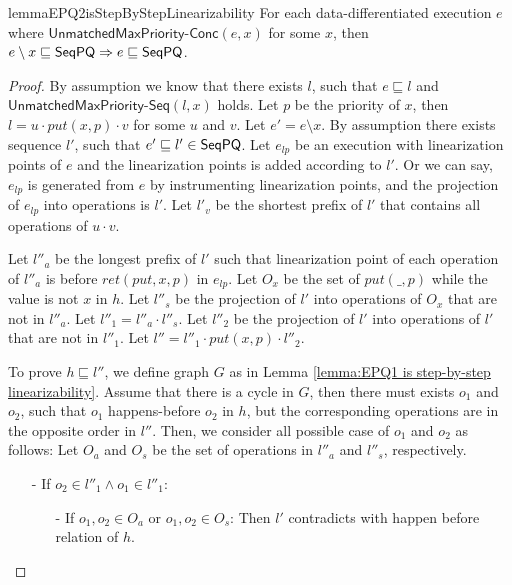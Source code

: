 \begin{restatable}{lemma}{EPQ2isStepByStepLinearizability}
\label{lemma:EPQ2 is step-by-step linearizability}
For each data-differentiated execution $e$ where $\mathsf{UnmatchedMaxPriority}\mathsf{\text{-}Conc}(e,x)$ for some $x$, then $e \setminus x \sqsubseteq \mathsf{SeqPQ} \Rightarrow e \sqsubseteq \mathsf{SeqPQ}$.
\end{restatable}

\begin {proof}

By assumption we know that there exists $l$, such that $e \sqsubseteq l$ and $\mathsf{UnmatchedMaxPriority\text{-}Seq}(l,x)$ holds. Let $p$ be the priority of $x$, then $l=u \cdot \textit{put}(x,p) \cdot v$ for some $u$ and $v$. Let $e' = e \setminus x$. By assumption there exists sequence $l'$, such that $e' \sqsubseteq l' \in \mathsf{SeqPQ}$. Let $e_{\textit{lp}}$ be an execution with linearization points of $e$ and the linearization points is added according to $l'$. Or we can say, $e_{\textit{lp}}$ is generated from $e$ by instrumenting linearization points, and the projection of $e_{\textit{lp}}$ into operations is $l'$. Let $l'_v$ be the shortest prefix of $l'$ that contains all operations of $u \cdot v$.


Let $l''_a$ be the longest prefix of $l'$ such that linearization point of each operation of $l''_a$ is before $\textit{ret}(\textit{put},x,p)$ in $e_{\textit{lp}}$. Let $O_x$ be the set of $\textit{put}(\_,p)$ while the value is not $x$ in $h$. Let $l''_s$ be the projection of $l'$ into operations of $O_x$ that are not in $l''_a$. Let $l''_1 = l''_a \cdot l''_s$. Let $l''_2$ be the projection of $l'$ into operations of $l'$ that are not in $l''_1$. Let $l'' = l''_1 \cdot \textit{put}(x,p) \cdot l''_2$.

To prove $h \sqsubseteq l''$, we define graph $G$ as in Lemma \ref{lemma:EPQ1 is step-by-step linearizability}. Assume that there is a cycle in $G$, then there must exists $o_1$ and $o_2$, such that $o_1$ happens-before $o_2$ in $h$, but the corresponding operations are in the opposite order in $l''$. Then, we consider all possible case of $o_1$ and $o_2$ as follows: Let $O_a$ and $O_s$ be the set of operations in $l''_a$ and $l''_s$, respectively.

\begin{itemize}
\setlength{\itemsep}{0.5pt}
\item[-] If $o_2 \in l''_1 \wedge o_1 \in l''_1$:
    \begin{itemize}
    \setlength{\itemsep}{0.5pt}
    \item[-] If $o_1,o_2 \in O_a$ or $o_1,o_2 \in O_s$: Then $l'$ contradicts with happen before relation of $h$.


\end{itemize}
\end{itemize}
\end{proof}
